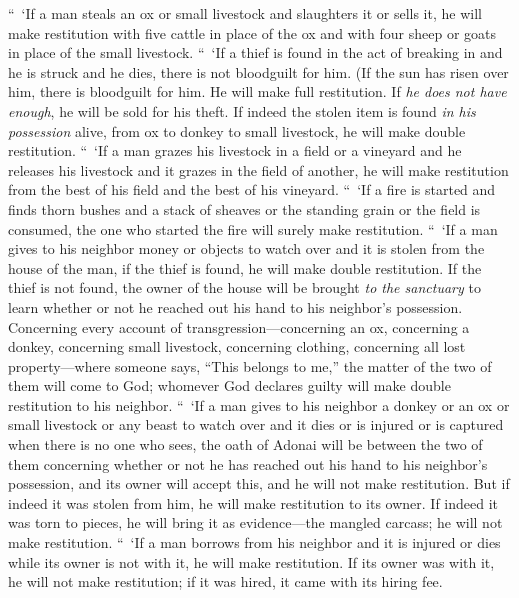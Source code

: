 \begin{biblechapter} %
  “ ‘If a man steals an ox or small livestock and slaughters it or sells it, he will make restitution with five cattle in place of the ox and with four sheep or goats in place of the small livestock.
\verse “ ‘If a thief is found in the act of breaking in and he is struck and he dies, there is not bloodguilt for him.
\verse (If the sun has risen over him, there is bloodguilt for him. He will make full restitution. If \textit{he does not have enough}, he will be sold for his theft.
\verse If indeed the stolen item is found \textit{in his possession} alive, from ox to donkey to small livestock, he will make double restitution.
\verse “ ‘If a man grazes his livestock in a field or a vineyard and he releases his livestock and it grazes in the field of another, he will make restitution from the best of his field and the best of his vineyard.
\verse “ ‘If a fire is started and finds thorn bushes and a stack of sheaves or the standing grain or the field is consumed, the one who started the fire will surely make restitution.
\verse “ ‘If a man gives to his neighbor money or objects to watch over and it is stolen from the house of the man, if the thief is found, he will make double restitution.
\verse If the thief is not found, the owner of the house will be brought \textit{to the sanctuary} to learn whether or not he reached out his hand to his neighbor’s possession.
\verse Concerning every account of transgression—concerning an ox, concerning a donkey, concerning small livestock, concerning clothing, concerning all lost property—where someone says, “This belongs to me,” the matter of the two of them will come to God; whomever God declares guilty will make double restitution to his neighbor.
\verse “ ‘If a man gives to his neighbor a donkey or an ox or small livestock or any beast to watch over and it dies or is injured or is captured when there is no one who sees,
\verse the oath of Adonai will be between the two of them concerning whether or not he has reached out his hand to his neighbor’s possession, and its owner will accept this, and he will not make restitution.
\verse But if indeed it was stolen from him, he will make restitution to its owner.
\verse If indeed it was torn to pieces, he will bring it as evidence—the mangled carcass; he will not make restitution.
\verse “ ‘If a man borrows from his neighbor and it is injured or dies while its owner is not with it, he will make restitution.
\verse If its owner was with it, he will not make restitution; if it was hired, it came with its hiring fee.

\end{biblechapter}
